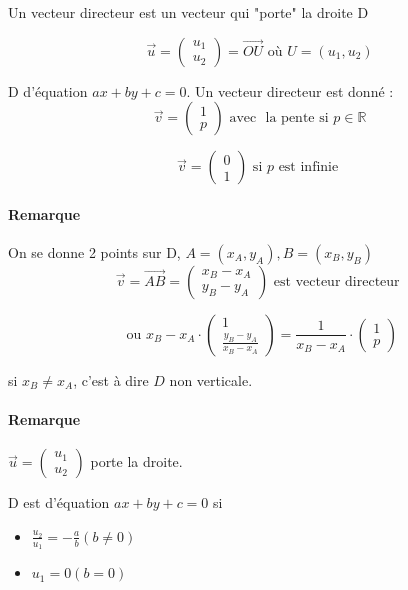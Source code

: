 Un vecteur directeur est un vecteur qui "porte" la droite D

\[\vec{u} = \begin{pmatrix}
	u_1 \\
	u_2
\end{pmatrix} = \overrightarrow{OU} \text{ où } U = (u_1, u_2)\]

D d'équation $ax +by +c = 0$.
Un vecteur directeur est donné :
\[\vec{v} = \begin{pmatrix}
	1 \\
	p
\end{pmatrix} \text{ avec } \text{ la pente si } p \in \mathbb{R}\]

\[\vec{v} = \begin{pmatrix}
	0 \\
	1
\end{pmatrix} \text{ si } p \text{ est infinie }\]

\paragraph{Remarque} On se donne 2 points sur D, $A = (x_A, y_A), B=(x_B, y_B)$ 
\[\vec{v} = \vec{AB} = \begin{pmatrix}
x_B - x_A \\
y_B - y_A
\end{pmatrix} \text{ est vecteur directeur }\]

\[\text{ ou } x_B - x_A \cdot \begin{pmatrix}
1 \\
\frac{y_B-y_A}{x_B-x_A}\end{pmatrix} = \frac{1}{x_B-x_A} \cdot \begin{pmatrix}
1 \\
p
\end{pmatrix}\]

si $x_B \neq x_A$, c'est à dire $D$ non verticale.

\paragraph{Remarque} $\vec{u} = \begin{pmatrix}
u_1 \\
u_2
\end{pmatrix}$ porte la droite.

D est d'équation $ax +by + c=0$ si 
\begin{itemize}
	\item $\frac{u_2}{u_1} = -\frac{a}{b} (b \neq 0)$
	\item $u_1 = 0 (b = 0)$
\end{itemize}

